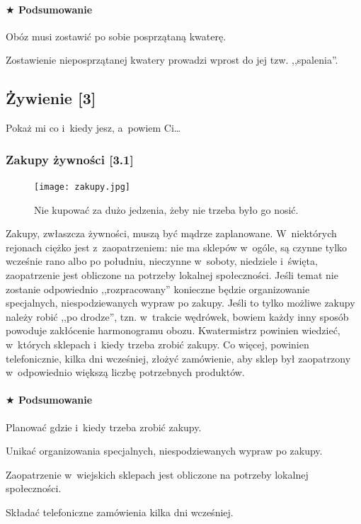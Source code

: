 \documentclass[a5paper,10pt,titlepage,twoside]{article}
\newcommand*{\thecheckbox}{\hss$\Box$} %
\newenvironment*{checklist}
{\list{}{%
\renewcommand*{\makelabel}[1]{\thecheckbox}}}
{\endlist}
\begin{document}
\paragraph{$\bigstar$ Podsumowanie}
\begin{checklist}
\item Obóz musi zostawić po sobie posprzątaną kwaterę.
\item Zostawienie nieposprzątanej kwatery prowadzi wprost do jej tzw. ,,spalenia''.
\end{checklist}
\subsection{Żywienie [3]}
Pokaż mi co i~kiedy jesz, a~powiem Ci\ldots
\subsubsection{Zakupy żywności [3.1]}
\begin{figure}[htp]
\centering
\texttt{[image: zakupy.jpg]}
\caption{Nie kupować za dużo jedzenia, żeby nie trzeba było go nosić.}\label{zakupy}
\end{figure}
Zakupy, zwłaszcza żywności, muszą być mądrze zaplanowane. W~niektórych rejonach ciężko jest z~zaopatrzeniem: nie ma sklepów w~ogóle, są czynne tylko wcześnie rano albo po południu, nieczynne w~soboty, niedziele i~święta, zaopatrzenie jest obliczone na potrzeby lokalnej społeczności. Jeśli temat nie zostanie odpowiednio ,,rozpracowany'' konieczne będzie organizowanie specjalnych, niespodziewanych wypraw po zakupy. Jeśli to tylko możliwe zakupy należy robić ,,po drodze'', tzn. w~trakcie wędrówek, bowiem każdy inny sposób powoduje zakłócenie harmonogramu obozu. Kwatermistrz powinien wiedzieć, w~których sklepach i~kiedy trzeba zrobić zakupy. Co więcej, powinien telefonicznie, kilka dni wcześniej, złożyć zamówienie, aby sklep był zaopatrzony w~odpowiednio większą liczbę potrzebnych produktów.
\paragraph{$\bigstar$ Podsumowanie}
\begin{checklist}
\item Planować gdzie i~kiedy trzeba zrobić zakupy.
\item Unikać organizowania specjalnych, niespodziewanych wypraw po zakupy.
\item Zaopatrzenie w~wiejskich sklepach jest obliczone na potrzeby lokalnej społeczności.
\item Składać telefoniczne zamówienia kilka dni wcześniej.
\end{checklist}
\end{document}
